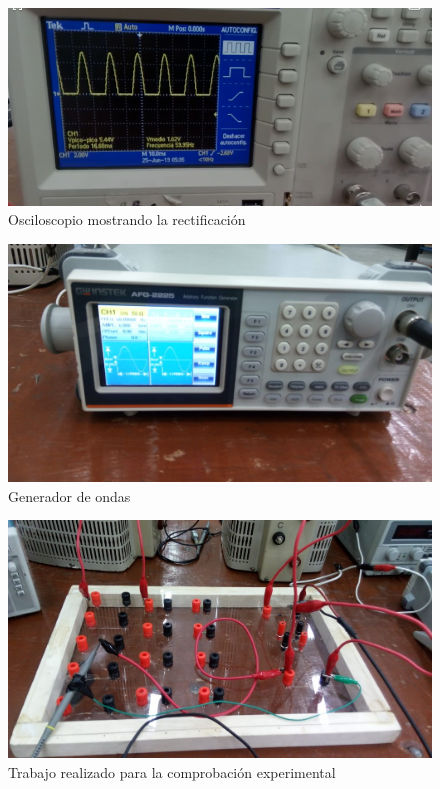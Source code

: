 \documentclass[a4paper,12pt]{report}
\begin{document}
\begin{figure}[H]
\begin{center}
\includegraphics[scale=0.7]{circ3.jpg}
\caption{Osciloscopio mostrando la rectificación}
\end{center}
\end{figure}
\begin{figure}[H]
\begin{center}
\includegraphics[scale=0.45]{circ2.jpg}
\caption{Generador de ondas}
\end{center}
\end{figure}
\begin{figure}[H]
\begin{center}
\includegraphics[scale=0.45]{circ4.jpg}
\caption{Trabajo realizado para la comprobación experimental}
\end{center}
\end{figure}
\end{document}
